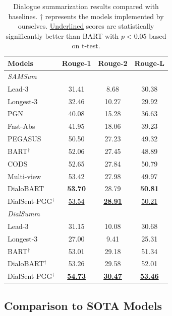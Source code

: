 \begin{table}
	\small
	\centering
	\begin{tabular}{lccc}
		\toprule[1pt]
		\textbf{Models} & \textbf{Rouge-1} & \textbf{Rouge-2} & \textbf{Rouge-L} \\
		\midrule[1pt]
		\multicolumn{4}{l}{\textit{SAMSum}} \\
		{Lead-3} & 31.41& 8.68&30.38 \\
		{Longest-3} &32.46 &10.27 &29.92 \\
		{PGN} &40.08 &15.28 &36.63 \\
		{Fast-Abs} &41.95 &18.06 &39.23 \\
		{PEGASUS}& 50.50 & 27.23 & 49.32 \\
		{BART$^\dag$} &52.06 &27.45 &48.89 \\
		{CODS} &52.65 &27.84 &50.79 \\
		{Multi-view} & 53.42& 27.98& 49.97\\
		{DialoBART} &\textbf{53.70} &28.79 &\textbf{50.81} \\
		{DialSent-PGG$^\dag$} &\underline{53.54} &\textbf{\underline{28.91}} &\underline{50.21} \\
		\midrule[1pt]
		\multicolumn{4}{l}{\textit{DialSumm}} \\
		{Lead-3} &31.15 &10.08 &30.68\\
		{Longest-3} &27.00 &9.41 &25.31 \\
		{BART$^\dag$} & 53.01& 29.18& 51.34\\
		{DialoBART$^\dag$} &53.26 &29.58 &52.01 \\
		{DialSent-PGG$^\dag$} &\textbf{\underline{54.73}} &\textbf{\underline{30.47}} &\textbf{\underline{53.46}} \\
		\bottomrule[1pt]
	\end{tabular}
	\caption{Dialogue summarization results compared with baselines. $\dag$ represents the models implemented by ourselves. \underline{Underlined} scores are statistically significantly better than BART with $p<0.05$ based on t-test. }
	\label{tab:end2end}
\end{table}

\subsection{Comparison to SOTA Models}\label{sec:end2end}

